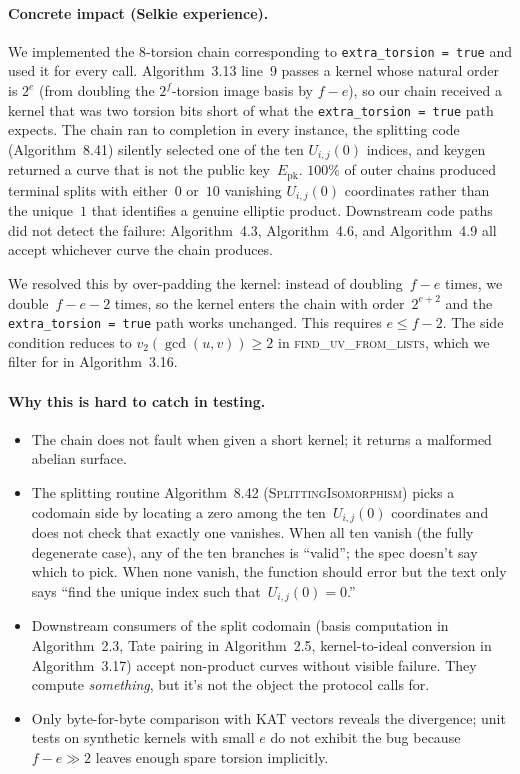 \documentclass[a4paper,11pt]{article}
\newcommand{\algo}[1]{Algorithm~#1}
\begin{document}
\paragraph{Concrete impact (Selkie experience).}
We implemented the 8-torsion chain corresponding to
\texttt{extra\_torsion = true} and used it for every call.
\algo{3.13} line~9 passes a kernel whose natural order is
$2^e$ (from doubling the $2^f$-torsion image basis by $f-e$),
so our chain received a kernel that was two torsion bits short of
what the \texttt{extra\_torsion = true} path expects.  The chain
ran to completion in every instance, the splitting code
(\algo{8.41}) silently selected one of the ten $U_{i,j}(0)$
indices, and keygen returned a curve that is not the public
key~$E_\mathrm{pk}$.  $100\%$ of outer chains produced
terminal splits with either~$0$ or~$10$ vanishing $U_{i,j}(0)$
coordinates rather than the unique~$1$ that identifies a genuine
elliptic product.  Downstream code paths did not detect the
failure: \algo{4.3}, \algo{4.6}, and \algo{4.9} all accept
whichever curve the chain produces.

We resolved this by over-padding the kernel: instead of
doubling~$f-e$ times, we double~$f-e-2$ times, so the kernel
enters the chain with order~$2^{e+2}$ and the
\texttt{extra\_torsion = true} path works unchanged.  This
requires $e \le f-2$.  The side condition reduces to
$v_2(\gcd(u,v)) \ge 2$ in \textsc{find\_uv\_from\_lists}, which
we filter for in \algo{3.16}.

\paragraph{Why this is hard to catch in testing.}
\begin{itemize}
  \item The chain does not fault when given a short kernel; it
    returns a malformed abelian surface.
  \item The splitting routine \algo{8.42}
    (\textsc{SplittingIsomorphism}) picks a codomain side by
    locating a zero among the ten~$U_{i,j}(0)$ coordinates and
    does not check that exactly one vanishes.  When all ten
    vanish (the fully degenerate case), any of the ten branches
    is ``valid''; the spec doesn't say which to pick.  When none
    vanish, the function should error but the text only says
    ``find the unique index such that~$U_{i,j}(0) = 0$.''
  \item Downstream consumers of the split codomain (basis
    computation in \algo{2.3}, Tate pairing in \algo{2.5},
    kernel-to-ideal conversion in \algo{3.17}) accept
    non-product curves without visible failure.  They compute
    \emph{something}, but it's not the object the protocol
    calls for.
  \item Only byte-for-byte comparison with KAT vectors reveals
    the divergence; unit tests on synthetic kernels with small
    $e$ do not exhibit the bug because $f - e \gg 2$ leaves
    enough spare torsion implicitly.
\end{itemize}
\end{document}
